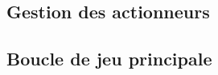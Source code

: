 \documentclass[a4paper,10pt]{report}
\begin{document}
\begin{spacing}{1.5}
\subsection{Gestion des actionneurs}
\subsection{Boucle de jeu principale}

\end{spacing}
\end{document}
